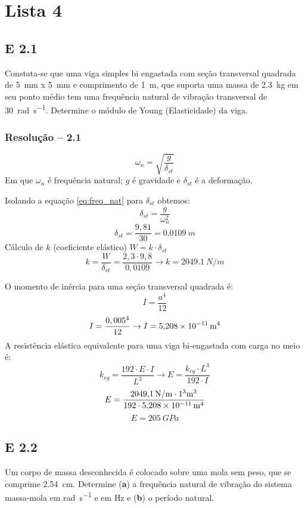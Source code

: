\section{Lista 4}
\subsection{E 2.1}
Constata-se que uma viga simples bi engastada
com seção transversal quadrada de \SI{5}{mm} x \SI{5}{mm} e
comprimento de \SI{1}{m}, que suporta uma massa de \SI{2,3}{\kilogram}
em seu ponto médio tem uma frequência natural de
vibração transversal de \SI{30}{\radian\per\second}. Determine o módulo
de Young (Elasticidade) da viga.

\subsubsection{Resolução -- 2.1}
\begin{equation}\label{eq:freq_nat}
    \omega_n = \sqrt{\frac{g}{\delta_{st}}}
\end{equation}
Em que $\omega_{n}$ é frequência natural; $g$ é gravidade e $\delta_{st}$ é a
deformação.

Isolando a equação \ref{eq:freq_nat} para $\delta_{st}$ obtemos:
\[
    \delta_{st}= \frac{g}{\omega_n^2}
\]
\[
    \delta_{st}=\frac{9,81}{30} = \SI{0,0109}{m}
\]
Cálculo de $k$ (coeficiente elástico) $W=k\cdot\delta_{st}$
\[
k = \frac{W}{\delta_{st}} =\frac{2,3\cdot9,8}{0,0109} \to k =
\SI{2049,1}{N /m}
\]

O momento de inércia para uma seção transversal quadrada é:
\begin{equation}\label{eq:mom_inercia_quad}
I=\frac{a^4}{12}
\end{equation}
\[
I = \frac{0,005^4}{12} \to I = \SI{5,208d-11}{m^4}
\]
A resistência elástica equivalente para uma viga bi-engastada com carga no meio
é:
\[
    k_{eq}=\frac{192\cdot E\cdot I}{L^3} \to E= \frac{k_{eq}\cdot L^3}{192\cdot I}
\]
\[
    E=\frac{\SI{2049,1}{N /m}\cdot\si{1^3m^3}}{192\cdot\SI{5,208d-11}{m^4} }
\]
\[
E = \SI{205}{GPa}
\]
\subsection{E 2.2}%
Um corpo de massa desconhecida é colocado sobre uma mola sem peso, que se
comprime \SI{2,54}{cm}. Determine (\textbf{a}) a frequência natural de
vibração do sistema massa-mola em \si{\radian\per\second} e em \si{Hz} e
(\textbf{b}) o período natural.

